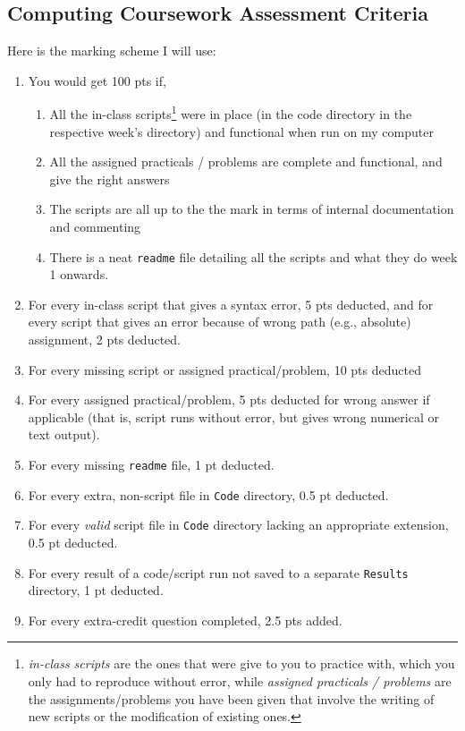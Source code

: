\begin{appendices} \appendixpage \noappendicestocpagenum \addappheadtotoc
{}
\chapter{Computing Coursework Assessment Criteria} \label{chap:Appendices}

Here is the marking scheme I will use:

	\begin{enumerate}
    \item You would get 100 pts if,
			\begin{enumerate}
				\item All the in-class scripts\footnote{{\it in-class scripts} are the ones that were give to you to practice with, which you only had to reproduce without error, while {\it assigned practicals / problems} are the assignments/problems you have been given that involve the writing of new scripts or the modification of existing ones. } were in place (in the code 
				directory in the respective week's directory) and functional 
				when run on my computer
        \item All the assigned practicals / problems are complete and functional, 
        and give the right answers
        \item The scripts are all up to the the mark in terms of internal documentation and commenting
        \item There is a neat {\tt readme} file detailing all the 
        scripts and what they do week 1 onwards.
      \end{enumerate}

    \item For every in-class script that gives a syntax error, 5 pts deducted, and for every script that gives an error because of wrong path (e.g., absolute) assignment, 2 pts deducted.
    \item For every missing script or assigned practical/problem, 10 pts deducted
    \item For every assigned practical/problem, 5 pts deducted for 
    wrong answer if applicable (that is, script runs without error, but 
    gives wrong numerical or text output).
    \item For every missing {\tt readme} file, 1 pt deducted.
		\item For every extra, non-script file in {\tt Code} directory, 0.5 
		pt deducted.
		\item For every {\it valid} script file in {\tt Code} directory 
		lacking an appropriate extension, 0.5 pt deducted.
		\item For every result of a code/script run not saved to a separate 
		{\tt Results} directory, 1 pt deducted.
    \item For every extra-credit question completed, 2.5 pts added.
	\end{enumerate}


\end{appendices}

